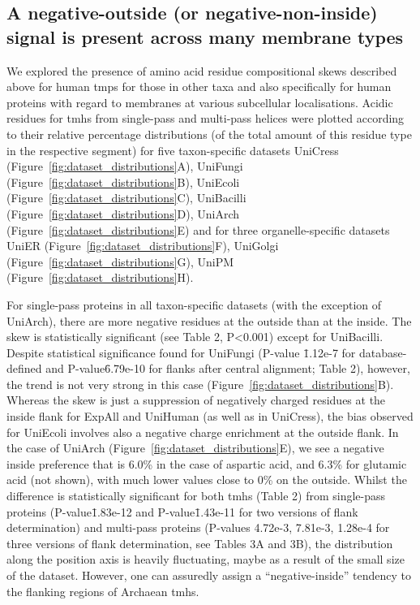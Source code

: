 \subsection{A negative-outside (or negative-non-inside) signal is present across many membrane types}

We explored the presence of amino acid residue compositional skews described above for human \gls{tmp}s for those in other taxa and also specifically for human proteins with regard to membranes at various subcellular localisations. Acidic residues for \gls{tmh}s from single-pass and multi-pass helices were plotted according to their relative percentage distributions (of the total amount of this residue type in the respective segment) for five taxon-specific datasets UniCress (Figure~\ref{fig:dataset_distributions}A), UniFungi (Figure~\ref{fig:dataset_distributions}B), UniEcoli (Figure~\ref{fig:dataset_distributions}C), UniBacilli (Figure~\ref{fig:dataset_distributions}D), UniArch (Figure~\ref{fig:dataset_distributions}E) and for three organelle-specific datasets UniER (Figure~\ref{fig:dataset_distributions}F), UniGolgi (Figure~\ref{fig:dataset_distributions}G), UniPM (Figure~\ref{fig:dataset_distributions}H).

For single-pass proteins in all taxon-specific datasets (with the exception of UniArch), there are more negative residues at the outside than at the inside. The skew is statistically significant (see Table 2, P<0.001) except for UniBacilli. Despite statistical significance found for UniFungi (P-value \= 1.12e-7 for database-defined and P-value\=6.79e-10 for flanks after central alignment; Table 2), however, the trend is not very strong in this case (Figure~\ref{fig:dataset_distributions}B). Whereas the skew is just a suppression of negatively charged residues at the inside flank for ExpAll and UniHuman (as well as in UniCress), the bias observed for UniEcoli involves also a negative charge enrichment at the outside flank. In the case of UniArch (Figure~\ref{fig:dataset_distributions}E), we see a negative inside preference that is 6.0\% in the case of aspartic acid, and 6.3\% for glutamic acid (not shown), with much lower values close to 0\% on the outside. Whilst the difference is statistically significant for both \gls{tmh}s (Table 2) from single-pass proteins (P-value\=1.83e-12 and P-value\=1.43e-11 for two versions of flank determination) and multi-pass proteins (P-values 4.72e-3, 7.81e-3, 1.28e-4 for three versions of flank determination, see Tables 3A and 3B), the distribution along the position axis is heavily fluctuating, maybe as a result of the small size of the dataset. However, one can assuredly assign a “negative-inside” tendency to the flanking regions of Archaean \gls{tmh}s.

